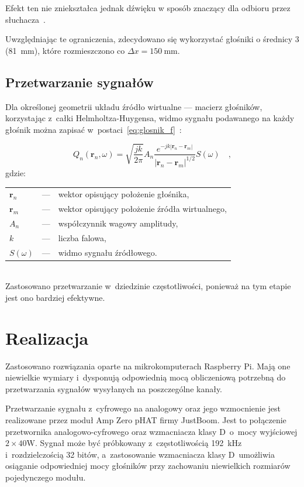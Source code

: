 \documentclass[10pt, a4paper]{article}
\let\Oldsection\section
\renewcommand{\section}{\FloatBarrier\Oldsection}
\let\Oldsubsection\subsection
\renewcommand{\subsection}{\FloatBarrier\Oldsubsection}
\begin{document}
Efekt ten nie zniekształca jednak dźwięku w sposób znaczący dla odbioru przez 
słuchacza~\cite{hq_rendering}.

Uwzględniając te ograniczenia, zdecydowano się wykorzystać głośniki o średnicy \SI{3}{\inch}
(\SI{81}{\milli\meter}), które rozmieszczono co $\Delta x=\SI{150}{\milli\meter}$.

\subsection{Przetwarzanie sygnałów}\label{s:algorithm}

Dla określonej geometrii układu źródło wirtualne --- macierz głośników,
korzystając z~całki Helmholtza-Huygensa, widmo sygnału podawanego na każdy głośnik można zapisać
w~postaci~\eqref{eq:glosnik_f}~\cite{enhancement}:

\begin{equation}
  Q_n(\bm{r}_n,\omega) = \sqrt{\frac{jk}{2\pi}} A_n \frac {e^{-jk|\bm{r}_n-\bm{r}_m|}}{|\bm{r}_n-\bm{r}_m|^{1/2}} S(\omega) \quad,
  \label{eq:glosnik_f}
\end{equation}
gdzie:\\
\indent \begin{tabular}{l c p{}}
  $\bm{r}_n$ & --- & wektor opisujący położenie głośnika, \\
  $\bm{r}_m$ & --- & wektor opisujący położenie źródła wirtualnego,\\
  $A_n$ & --- & współczynnik wagowy amplitudy,\\
  $k$ & --- & liczba falowa,\\
  $S(\omega)$ & --- & widmo sygnału źródłowego.
\end{tabular}\\

Zastosowano przetwarzanie w~dziedzinie częstotliwości, ponieważ na tym etapie jest ono bardziej efektywne.

\section{Realizacja}

Zastosowano rozwiązania oparte na mikrokomputerach Raspberry
Pi. Mają one niewielkie wymiary i~dysponują odpowiednią mocą obliczeniową
potrzebną do przetwarzania sygnałów wysyłanych na poszczególne kanały.

Przetwarzanie sygnału z~cyfrowego na analogowy oraz jego wzmocnienie jest
realizowane przez moduł Amp Zero pHAT firmy JustBoom. Jest to połączenie
przetwornika analogowo-cyfrowego oraz wzmacniacza klasy D~o~mocy wyjściowej
$2\times40\si{\watt}$. Sygnał może być próbkowany z~częstotliwością
\SI{192}{\kilo\hertz} i~rozdzielczością \num{32} bitów, a~zastosowanie
wzmacniacza klasy D~umożliwia osiąganie odpowiedniej mocy głośników przy
zachowaniu niewielkich rozmiarów pojedynczego modułu.
\end{document}
